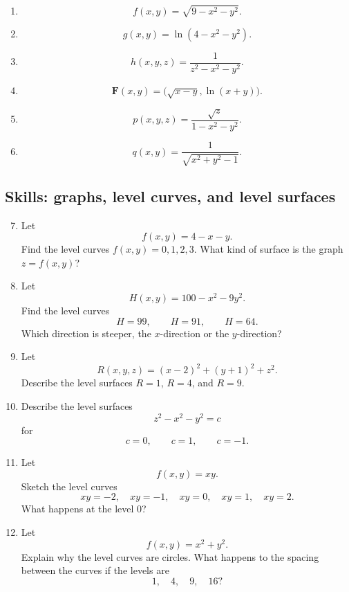 \begin{enumerate}
\item
\[
    f(x,y)=\sqrt{9-x^2-y^2}.
\]

\item
\[
    g(x,y)=\ln(4-x^2-y^2).
\]

\item
\[
    h(x,y,z)=\frac{1}{z^2-x^2-y^2}.
\]

\item
\[
    \mathbf F(x,y)=\bigl(\sqrt{x-y},\ln(x+y)\bigr).
\]

\item
\[
    p(x,y,z)=\frac{\sqrt z}{1-x^2-y^2}.
\]

\item
\[
    q(x,y)=\frac{1}{\sqrt{x^2+y^2-1}}.
\]
\end{enumerate}

\subsection*{Skills: graphs, level curves, and level surfaces}

\begin{enumerate}
\setcounter{enumi}{6}

\item Let
\[
    f(x,y)=4-x-y.
\]
Find the level curves \(f(x,y)=0,1,2,3\).  What kind of surface is the graph
\(z=f(x,y)\)?

\item Let
\[
    H(x,y)=100-x^2-9y^2.
\]
Find the level curves
\[
    H=99,\qquad H=91,\qquad H=64.
\]
Which direction is steeper, the \(x\)-direction or the \(y\)-direction?

\item Let
\[
    R(x,y,z)=(x-2)^2+(y+1)^2+z^2.
\]
Describe the level surfaces \(R=1\), \(R=4\), and \(R=9\).

\item Describe the level surfaces
\[
    z^2-x^2-y^2=c
\]
for
\[
    c=0,\qquad c=1,\qquad c=-1.
\]

\item Let
\[
    f(x,y)=xy.
\]
Sketch the level curves
\[
    xy=-2,\quad xy=-1,\quad xy=0,\quad xy=1,\quad xy=2.
\]
What happens at the level \(0\)?

\item Let
\[
    f(x,y)=x^2+y^2.
\]
Explain why the level curves are circles.  What happens to the spacing between
the curves if the levels are
\[
    1,\quad 4,\quad 9,\quad 16?
\]
\end{enumerate}

